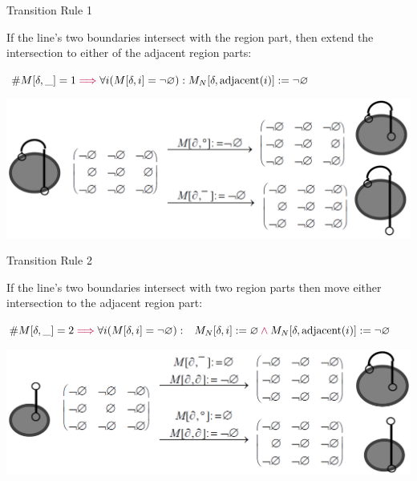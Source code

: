 	\begin{frame}{Transition Rule 1}
		\begin{block}{}
			If the line's two boundaries intersect with the  region part, then extend the intersection to either of the adjacent region parts:
		\end{block}
		\begin{block}{}
			\centering $ \#M[\delta, \_] = 1 \textcolor{purple}{\implies}
			\forall i (M[\delta, i] = \mbox{$\neg\varnothing$}):
			M_{N}[\delta, \text{adjacent}(i)] := \mbox{$\neg\varnothing$} $
		\end{block}
		\begin{block}{}
			\includegraphics[width=\textwidth]{images/smooth_transitions_example_a.png}
		\end{block}
	\end{frame}

	
	\begin{frame}{Transition Rule 2}
		\begin{block}{}
			If the line's two boundaries intersect with two  region parts then move either intersection to the adjacent region part:
		\end{block}
		\begin{block}{}
			\centering $ \#M[\delta,\_] = 2 \textcolor{purple}{\implies}
			\forall i (M[\delta, i] = \mbox{$\neg\varnothing$}):$
			$M_{N}[\delta, i] := \mbox{$\varnothing$} \textcolor{purple}{{}\land{}}
			M_{N}[\delta, \text{adjacent}(i)] := \mbox{$\neg\varnothing$} $
		\end{block}
		\begin{block}{}
			\includegraphics[width=\textwidth]{images/smooth_transitions_example_b.png}
		\end{block}
	\end{frame}

	
